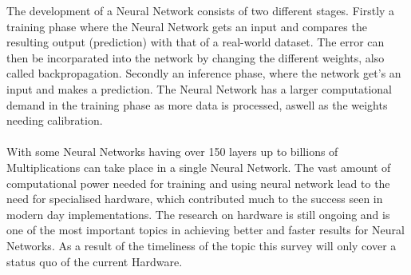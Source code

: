 \documentclass[conference]{IEEEtran}
\begin{document}
The development of a Neural Network consists of two different stages. Firstly a training phase where the Neural Network gets an input and compares the resulting output (prediction) with that of a real-world dataset. The error can then be incorparated into the network by changing the different weights, also called backpropagation. Secondly an inference phase, where the network get's an input and makes a prediction. The Neural Network has a larger computational demand in the training phase as more data is processed, aswell as the weights needing calibration.
\\
\\
With some Neural Networks having over 150 layers \cite{densely_network} up to billions of Multiplications can take place in a single Neural Network. The vast amount of computational power needed for training and using neural network lead to the need for specialised hardware, which contributed much to the success seen in modern day implementations. The research on hardware is still ongoing and is one of the most important topics in achieving better and faster results for Neural Networks. As a result of the timeliness of the topic this survey will only cover a status quo of the current Hardware.
\\
\end{document}
